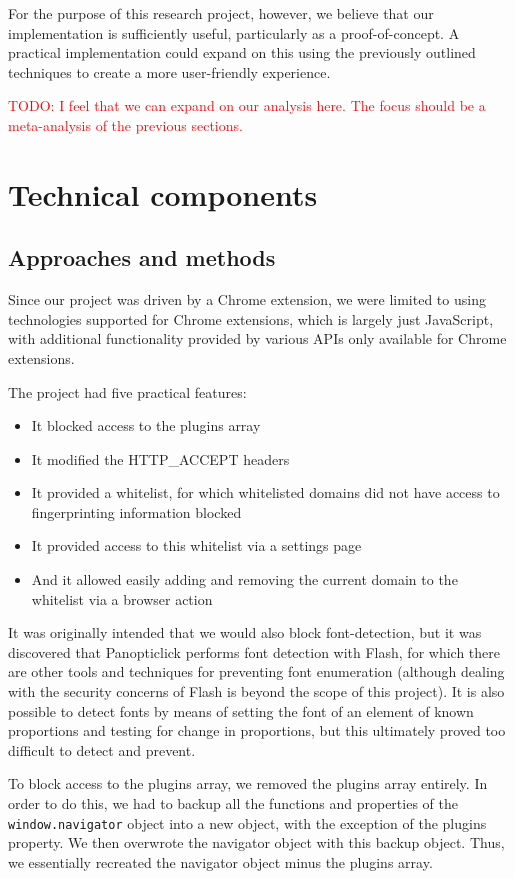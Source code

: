 \documentclass[12pt,a4paper]{article}
\begin{document}
For the purpose of this research project, however, we believe that our implementation is sufficiently useful, particularly as a proof-of-concept. A practical implementation could expand on this using the previously outlined techniques to create a more user-friendly experience.

\textcolor{red}{TODO: I feel that we can expand on our analysis here. The focus should be a meta-analysis of the previous sections.}

\section{Technical components}
\subsection{Approaches and methods}
Since our project was driven by a Chrome extension, we were limited to using technologies supported for Chrome extensions, which is largely just JavaScript, with additional functionality provided by various APIs only available for Chrome extensions.

The project had five practical features:
\begin{itemize}
	\item It blocked access to the plugins array
	\item It modified the HTTP\_ACCEPT headers
	\item It provided a whitelist, for which whitelisted domains did not have access to fingerprinting information blocked
	\item It provided access to this whitelist via a settings page
	\item And it allowed easily adding and removing the current domain to the whitelist via a browser action
\end{itemize}

It was originally intended that we would also block font-detection, but it was discovered that Panopticlick performs font detection with Flash, for which there are other tools and techniques for preventing font enumeration (although dealing with the security concerns of Flash is beyond the scope of this project). It is also possible to detect fonts by means of setting the font of an element of known proportions and testing for change in proportions, but this ultimately proved too difficult to detect and prevent.

To block access to the plugins array, we removed the plugins array entirely. In order to do this, we had to backup all the functions and properties of the \texttt{window.navigator} object into a new object, with the exception of the plugins property. We then overwrote the navigator object with this backup object. Thus, we essentially recreated the navigator object minus the plugins array.
\end{document}
